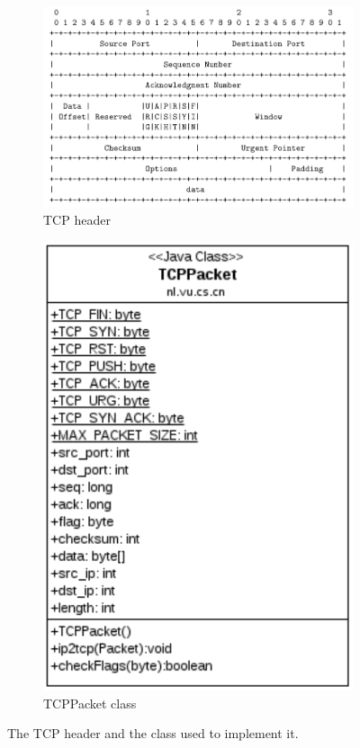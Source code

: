 \documentclass{article}
\begin{document}
\begin{figure}[h!]
\centering
\begin{subfigure}[b]{0.4\textwidth}
\includegraphics[width=\textwidth]{images/tcp_header}
\caption{TCP header}
\end{subfigure}
\qquad
\begin{subfigure}[b]{0.2\textwidth}
 \includegraphics[width=\textwidth]{images/cn_uml}
 \caption{TCPPacket class}
 \label{fig:tcppacket}
\end{subfigure}
\caption{The TCP header and the class used to implement it.}
\label{fig:header}
\end{figure}
\end{document}
